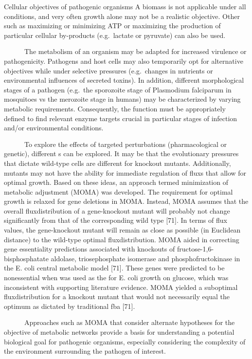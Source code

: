 \begin{pabox}[label=trends:box:objective]{Cellular objectives of pathogenic organisms}
A \gls{biomass} is not applicable under 
all conditions, and very often growth alone may not be 
a realistic objective. Other  such as maximizing 
or minimizing ATP or maximizing the production of 
particular cellular by-products (e.g.\ lactate or pyruvate) 
can also be used.

~~~~~~The metabolism of an organism may be adapted for increased 
virulence or pathogenicity. Pathogens and host cells may 
also temporarily opt for alternative objectives while under 
selective pressures (e.g.\ changes in nutrients or 
environmental influences of secreted toxins). In addition, 
different morphological stages of a pathogen (e.g.\ the sporozoite 
stage of Plasmodium falciparum in mosquitoes vs the merozoite 
stage in humans) may be characterized by varying metabolic 
requirements. Consequently, the  function must be 
appropriately defined to find relevant enzyme targets crucial 
in particular stages of infection and/or environmental conditions.

~~~~~~To explore the effects of targeted perturbations 
(pharmacological or genetic), different s 
can be explored. It may be that the evolutionary 
pressures that dictate wild-type cells are different 
for knockout mutants. Additionally, mutants may 
not have the ability for immediate regulation of 
\glspl{flux} that allow for optimal growth. Based on these 
ideas, an approach termed minimization of metabolic 
adjustment (MOMA) was developed. The requirement for 
optimal growth is relaxed for gene deletions in MOMA. 
Instead, MOMA assumes that the overall \gls{fluxdistribution} 
of a gene-knockout mutant will probably not change 
significantly from that of the corresponding wild type [71]. 
In terms of \gls{flux} values, the gene-knockout mutant will 
remain as close as possible (in Euclidean distance) to 
the wild-type optimal \gls{fluxdistribution}. MOMA aided in correcting 
gene essentiality predictions associated with knockouts 
of fructose-1,6-bisphosphatate aldolase, triosephosphate 
isomerase and phosphofructokinase in the E. coli 
central metabolic model [71]. These genes were predicted 
to be nonessential when  was used as the  
for E. coli growth on glucose, which was inconsistent with 
supporting literature evidence. MOMA yielded a suboptimal 
\gls{fluxdistribution} for a knockout mutant that would not 
necessarily equal the optimum as dictated by traditional 
\gls{fba} [71].

~~~~~~Approaches such as MOMA that consider alternate hypotheses 
for the objective of metabolic networks provide a basis 
for understanding a potential biological goal for pathogenic 
organisms, especially considering the complexity of the 
environment surrounding the pathogen of interest.
\end{pabox}
